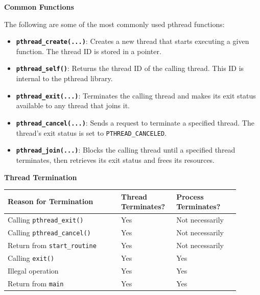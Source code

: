 \documentclass[openany,12pt]{book}
\newcommand{\code}[1]{\texttt{#1}}
\begin{document}
\noindent %
\begin{minipage}[t]{0.48\textwidth}
\begin{center}
  \textbf{Common Functions}
\end{center}
The following are some of the most commonly used pthread functions:
\begin{itemize}
    \item \textbf{\code{pthread\_create(...)}}: Creates a new thread that starts executing a given function. The thread ID is stored in a pointer.
    
    \item \textbf{\code{pthread\_self()}}: Returns the thread ID of the calling thread. This ID is internal to the pthread library.

    \item \textbf{\code{pthread\_exit(...)}}: Terminates the calling thread and makes its exit status available to any thread that joins it.

    \item \textbf{\code{pthread\_cancel(...)}}: Sends a request to terminate a specified thread. The thread's exit status is set to \code{PTHREAD\_CANCELED}.

    \item \textbf{\code{pthread\_join(...)}}: Blocks the calling thread until a specified thread terminates, then retrieves its exit status and frees its resources.
\end{itemize}
\end{minipage}
\hfill %
\begin{minipage}[t]{0.5\textwidth}
  \begin{center}
    \textbf{Thread Termination}
  \end{center}
\centering %
\begin{tabular}{|>{\raggedright\arraybackslash}p{0.45\linewidth}|
    >{\centering\arraybackslash}p{0.2\linewidth}|
    >{\centering\arraybackslash}p{0.25\linewidth}|}
    \hline
    \rowcolor{blue!30}
    \textbf{Reason for Termination} & \textbf{Thread Terminates?} & \textbf{Process Terminates?} \\
    \hline
    Calling \code{pthread\_exit()} & Yes & Not necessarily \\
    Calling \code{pthread\_cancel()} & Yes & Not necessarily \\
    Return from \code{start\_routine} & Yes & Not necessarily \\
    \hline
    Calling \code{exit()} & Yes & Yes \\
    Illegal operation & Yes & Yes \\
    Return from \code{main} & Yes & Yes \\
    \hline
\end{tabular}
\end{minipage}
\end{document}
